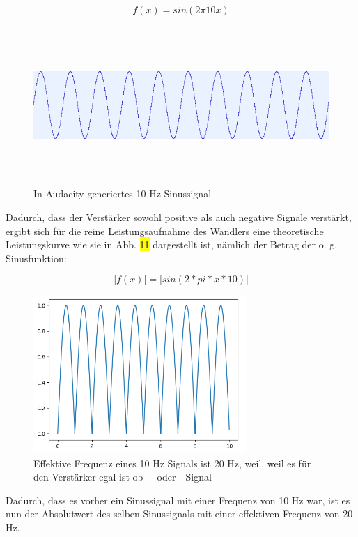 \begin{flushleft}
\begin{equation}
f(x) = sin(2\pi10x)
\end{equation}

\begin{figure}[H]
    \centering
    \includegraphics[height= 6cm, width = \textwidth]{Pictures/Sinus_Aud.png}
    \caption{In Audacity generiertes 10 Hz Sinussignal}
\end{figure}


Dadurch, dass der Verstärker sowohl positive als auch negative Signale verstärkt, ergibt sich für die reine Leistungsaufnahme des Wandlers eine theoretische Leistungskurve wie sie in Abb. \hl{11} dargestellt ist, nämlich  der Betrag der o. g. Sinusfunktion:

\begin{equation}
|f(x)| = |sin(2 * pi*x*10)|
\end{equation}


\begin{figure}[H]
    \centering
    \includegraphics[height= 6cm, width = \textwidth]{Pictures/Clapped_Sine.png}
    \caption{Effektive Frequenz eines 10 Hz Signals ist 20 Hz, weil, weil es für den Verstärker egal ist ob + oder - Signal }
\end{figure}

Dadurch, dass es vorher ein Sinussignal mit einer Frequenz von 10 Hz war, ist es nun der Absolutwert des selben Sinussignals mit einer effektiven Frequenz von 20 Hz.


\end{flushleft}
